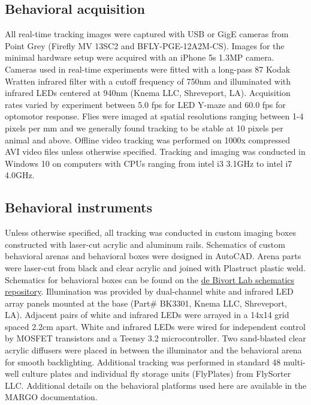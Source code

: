 \documentclass[10pt,letterpaper]{article}
\begin{document}
 \subsection*{Behavioral acquisition}

All real-time tracking images were captured with USB or GigE cameras from Point Grey (Firefly MV 13SC2 and BFLY-PGE-12A2M-CS). Images for the minimal hardware setup were acquired with an iPhone 5s 1.3MP camera. Cameras used in real-time experiments were fitted with a long-pass 87 Kodak Wratten infrared filter with a cutoff frequency of 750nm and illuminated with infrared LEDs centered at 940nm (Knema LLC, Shreveport, LA). Acquisition rates varied by experiment between 5.0 fps for LED Y-maze and 60.0 fps for optomotor response. Flies were imaged at spatial resolutions ranging between 1-4 pixels per mm and we generally found tracking to be stable at 10 pixels per animal and above. Offline video tracking was performed on 1000x compressed AVI video files unless otherwise specified. Tracking and imaging was conducted in Windows 10 on computers with CPUs ranging from intel i3 3.1GHz to intel i7 4.0GHz. 

 \subsection*{Behavioral instruments}

Unless otherwise specified, all tracking was conducted in custom imaging boxes constructed with laser-cut acrylic and aluminum rails. Schematics of custom behavioral arenas and behavioral boxes were designed in AutoCAD. Arena parts were laser-cut from black and clear acrylic and joined with Plastruct plastic weld. Schematics for behavioral boxes can be found on the \href{https://github.com/de-Bivort-Lab/dblab-schematics}{de Bivort Lab schematics repository}. Illumination was provided by dual-channel white and infrared LED array panels mounted at the base (Part\# BK3301, Knema LLC, Shreveport, LA). Adjacent pairs of white and infrared LEDs were arrayed in a 14x14 grid spaced 2.2cm apart. White and infrared LEDs were wired for independent control by MOSFET transistors and a Teensy 3.2 microcontroller. Two sand-blasted clear acrylic diffusers were placed in between the illuminator and the behavioral arena for smooth backlighting. Additional tracking was performed in standard 48 multi-well culture plates and individual fly storage units (FlyPlates) from FlySorter LLC. Additional details on the behavioral platforms used here are available in the MARGO documentation.
\end{document}
